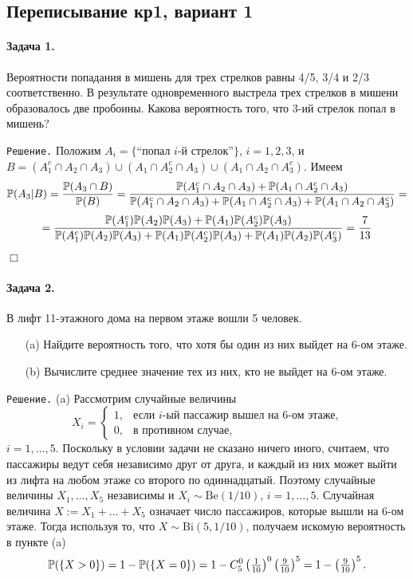 \documentclass[12pt, a4paper]{article}\usepackage[]{graphicx}\usepackage[]{color}
\begin{document}
				\subsection{Переписывание кр1, вариант 1}

				\paragraph{Задача 1.} %
				Вероятности попадания в мишень для трех стрелков равны 4/5, 3/4 и 2/3 соответственно. В результате одновременного выстрела трех стрелков в мишени образовалось две пробоины. Какова вероятность того, что 3-ий стрелок попал в мишень?

				\verb"Решение." Положим $A_i = \{\text{``попал $i$-й стрелок''}\}$, $i = 1,2,3$, и $B = (A_1^c \cap A_2 \cap A_3) \cup (A_1 \cap A_2^c \cap A_3) \cup (A_1 \cap A_2 \cap A_3^c)$. Имеем
				\[
				\P(A_3|B) = \frac{\P(A_3 \cap B)}{\P(B)} = \frac{\P(A_1^c \cap A_2 \cap A_3) + \P(A_1 \cap A_2^c \cap A_3)}{\P(A_1^c \cap A_2 \cap A_3) + \P(A_1 \cap A_2^c \cap A_3) + \P(A_1 \cap A_2 \cap A_3^c)} =
				\]
				\[
				= \frac{\P(A_1^c)\P(A_2)\P(A_3) + \P(A_1)\P(A_2^c)\P(A_3)}{\P(A_1^c)\P(A_2)\P(A_3) + \P(A_1)\P(A_2^c)\P(A_3) + \P(A_1)\P(A_2)\P(A_3^c)} = \frac{7}{13}
				\]
				$\Box$
				\paragraph{Задача 2.}
				В лифт 11-этажного дома на первом этаже вошли 5 человек.
				\begin{itemize}
					\item[(a)] Найдите вероятность того, что хотя бы один из них выйдет на 6-ом этаже.
					\item[(b)] Вычислите среднее значение тех из них, кто не выйдет на 6-ом этаже.
				\end{itemize}

				\verb"Решение." (a) Рассмотрим случайные величины
				\[
				X_i =
				\begin{cases}
				1,     &   \text{если $i$-ый пассажир вышел на 6-ом этаже,} \\
				0,     &   \text{в противном случае,}
				\end{cases}
				\]
				$i = 1,\ldots,5$. Поскольку в условии задачи не сказано ничего иного, считаем, что пассажиры ведут себя независимо друг от друга, и каждый из них может выйти из лифта на любом этаже со второго по одиннадцатый. Поэтому случайные величины $X_1, \dots, X_5$ независимы и $X_i \sim \mathrm{Be}(1/10)$, $i = 1,\ldots,5$.
				Случайная величина $X:=X_1+\ldots+X_5$ означает число пассажиров, которые вышли на 6-ом этаже. Тогда используя то, что $X \sim \mathrm{Bi}(5,1/10)$, получаем искомую вероятность в пункте (a)
				\[
				\P(\{X>0\}) = 1 - \P(\{X=0\}) = 1 - C_{5}^{0}\left(\tfrac{1}{10}\right)^{0}\left(\tfrac{9}{10}\right)^{5} = 1 - \left(\tfrac{9}{10}\right)^{5} \text{.}
				\]
\end{document}

